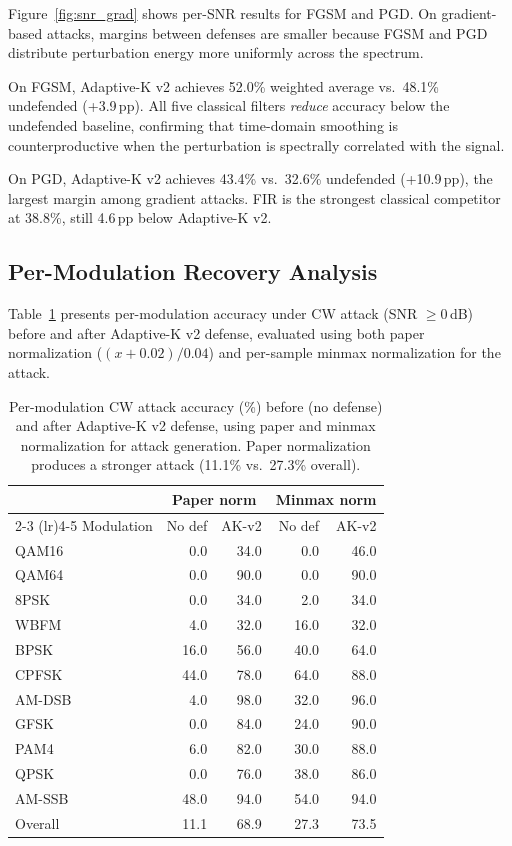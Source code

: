 Figure~\ref{fig:snr_grad} shows per-SNR results for FGSM and PGD.  On
gradient-based attacks, margins between defenses are smaller because FGSM
and PGD distribute perturbation energy more uniformly across the spectrum.

On FGSM, Adaptive-K v2 achieves 52.0\% weighted average vs.\ 48.1\%
undefended (+3.9\,pp).  All five classical filters \emph{reduce} accuracy
below the undefended baseline, confirming that time-domain smoothing is
counterproductive when the perturbation is spectrally correlated with the
signal.

On PGD, Adaptive-K v2 achieves 43.4\% vs.\ 32.6\% undefended (+10.9\,pp),
the largest margin among gradient attacks.  FIR is the strongest classical
competitor at 38.8\%, still 4.6\,pp below Adaptive-K v2.

\subsection{Per-Modulation Recovery Analysis}

Table~\ref{tab:per_mod} presents per-modulation accuracy under CW attack
(SNR $\geq 0$\,dB) before and after Adaptive-K v2 defense, evaluated using
both paper normalization ($(x+0.02)/0.04$) and per-sample minmax normalization
for the attack.

\begin{table}[t]
\caption{Per-modulation CW attack accuracy (\%) before (no defense) and after
  Adaptive-K v2 defense, using paper and minmax normalization for attack
  generation.  Paper normalization produces a stronger attack (11.1\% vs.\
  27.3\% overall).}
\label{tab:per_mod}
\centering
\small
\begin{tabular}{lrrrr}
\toprule
           & \multicolumn{2}{c}{Paper norm} & \multicolumn{2}{c}{Minmax norm} \\
\cmidrule(lr){2-3} \cmidrule(lr){4-5}
Modulation & No def & AK-v2 & No def & AK-v2 \\
\midrule
QAM16      &   0.0 & 34.0 &   0.0 & 46.0 \\
QAM64      &   0.0 & 90.0 &   0.0 & 90.0 \\
8PSK       &   0.0 & 34.0 &   2.0 & 34.0 \\
WBFM       &   4.0 & 32.0 &  16.0 & 32.0 \\
BPSK       &  16.0 & 56.0 &  40.0 & 64.0 \\
CPFSK      &  44.0 & 78.0 &  64.0 & 88.0 \\
AM-DSB     &   4.0 & 98.0 &  32.0 & 96.0 \\
GFSK       &   0.0 & 84.0 &  24.0 & 90.0 \\
PAM4       &   6.0 & 82.0 &  30.0 & 88.0 \\
QPSK       &   0.0 & 76.0 &  38.0 & 86.0 \\
AM-SSB     &  48.0 & 94.0 &  54.0 & 94.0 \\
\midrule
Overall    &  11.1 & 68.9 &  27.3 & 73.5 \\
\bottomrule
\end{tabular}
\end{table}

